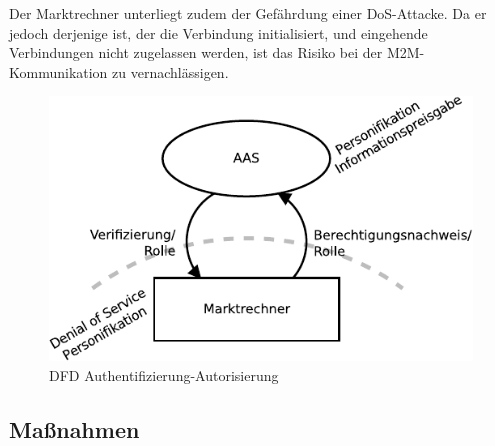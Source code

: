 \documentclass[11pt,a4paper]{report}
\begin{document}
Der Marktrechner unterliegt zudem der Gefährdung einer DoS-Attacke. Da er jedoch derjenige ist, der die Verbindung initialisiert, und eingehende Verbindungen nicht zugelassen werden, ist das Risiko bei der M2M-Kommunikation zu vernachlässigen.

\begin{figure}[htbp]
\centering
\includegraphics[scale=1.1]{images/dfd_auth_threat.pdf}
\caption{DFD Authentifizierung-Autorisierung}
\label{fig:dfd_auth_threat}
\end{figure}

\subsection{Maßnahmen} \label{sec:mod_measures_m2m}
\end{document}
